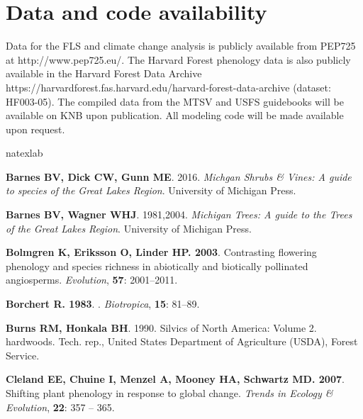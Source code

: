 \documentclass[11pt]{article}
\begin{document}
{\section*{Data and code availability}
Data for the FLS and climate change analysis is publicly available from PEP725 at http://www.pep725.eu/. The Harvard Forest phenology data is also publicly available in the Harvard Forest Data Archive https://harvardforest.fas.harvard.edu/harvard-forest-data-archive (dataset: HF003-05). The compiled data from the MTSV and USFS guidebooks will be available on KNB upon publication. All modeling code will be made available upon request. %


%
\begin{thebibliography}{39}
\expandafter\ifx\csname natexlab\endcsname\relax\def\natexlab#1{#1}\fi

{\bf Barnes BV, Dick CW, Gunn ME}. 2016.
\newblock \emph{Michgan Shrubs & Vines: A guide to species of the Great Lakes
  Region}.
\newblock University of Michigan Press.

{\bf Barnes BV, Wagner WHJ}. 1981,2004.
\newblock \emph{Michigan Trees: A guide to the Trees of the Great Lakes
  Region}.
\newblock University of Michigan Press.

{\bf Bolmgren K, Eriksson O, Linder HP}{\bf . 2003}.
\newblock Contrasting flowering phenology and species richness in abiotically
  and biotically pollinated angiosperms.
\newblock \emph{Evolution}, {\bf 57}: 2001--2011.

{\bf Borchert R}{\bf . {1983}}.
.
\newblock \emph{{Biotropica}}, {\bf {15}}: {81--89}.

{\bf Burns RM, Honkala BH}. 1990.
\newblock Silvics of North America: Volume 2. hardwoods.
\newblock Tech. rep., United States Department of Agriculture (USDA), Forest
  Service.

{\bf Cleland EE, Chuine I, Menzel A, Mooney HA, Schwartz MD}{\bf . 2007}.
\newblock Shifting plant phenology in response to global change.
\newblock \emph{Trends in Ecology & Evolution}, {\bf 22}: 357 -- 365.


\end{thebibliography}}
\end{document}
